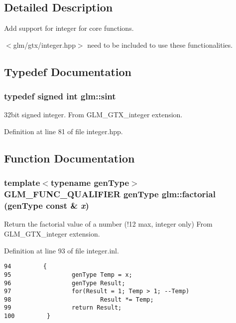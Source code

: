 \subsection{Detailed Description}
Add support for integer for core functions. 

$<$glm/gtx/integer.hpp$>$ need to be included to use these functionalities. 

\subsection{Typedef Documentation}
\hypertarget{group__gtx__integer_g73643e09d8c6d362418aec541fdb987d}{
\subsubsection[sint]{\setlength{\rightskip}{0pt plus 5cm}typedef signed int {\bf glm::sint}}}
\label{group__gtx__integer_g73643e09d8c6d362418aec541fdb987d}


32bit signed integer. From GLM\_\-GTX\_\-integer extension. 

Definition at line 81 of file integer.hpp.

\subsection{Function Documentation}
\hypertarget{group__gtx__integer_g57ba2a6a2729f23ba4848bbad551dcd1}{
\subsubsection[factorial]{\setlength{\rightskip}{0pt plus 5cm}template$<$typename genType$>$ GLM\_\-FUNC\_\-QUALIFIER genType glm::factorial (genType const \& {\em x})}}
\label{group__gtx__integer_g57ba2a6a2729f23ba4848bbad551dcd1}


Return the factorial value of a number (!12 max, integer only) From GLM\_\-GTX\_\-integer extension. 

Definition at line 93 of file integer.inl.

\begin{Code}\begin{verbatim}94         {
95                 genType Temp = x;
96                 genType Result;
97                 for(Result = 1; Temp > 1; --Temp)
98                         Result *= Temp;
99                 return Result;
100         }
\end{verbatim}
\end{Code}



